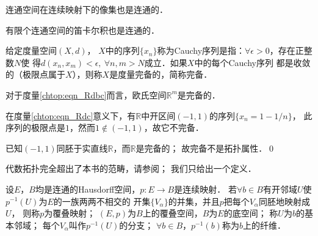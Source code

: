 \begin{proposition}
    连通空间在连续映射下的像集也是连通的．
\end{proposition}

\begin{proposition}
    有限个连通空间的笛卡尔积也是连通的．
\end{proposition}


\begin{definition}\label{chtop:def_complete-metric}
    给定度量空间$(X,d)$，
    $X$中的序列$\{x_n\}$称为Cauchy序列是指：$\forall \epsilon >0 $，存在正整数$N$使
    得$d(x_n,x_m)<\epsilon,\ \forall n,m>N$成立．如果$X$中的每个Cauchy序列
    都是收敛的（极限点属于$X$），则称$X$是{\heiti 度量完备}的，简称{\heiti 完备}．
     
\end{definition}

\begin{proposition}
    对于度量\eqref{chtop:eqn_Rdbc}而言，欧氏空间$\mathbb{R}^m$是完备的．
\end{proposition}

\begin{example}
    在度量\eqref{chtop:eqn_Rdc}意义下，有$\mathbb{R}$中开区间$(-1,1)$的序列$\{x_n=1-1/n\}$，
    此序列的极限点是$1$，然而$1 \notin (-1,1)$，故它不完备．
    
    已知$(-1,1)$同胚于实直线$\mathbb{R}$，而$\mathbb{R}$是完备的；
    故{\kaishu 完备不是拓扑属性}．\qed
\end{example}

代数拓扑完全超出了本书的范畴，请参阅\parencite{munkres-2000-topology}；
我们只给出一个定义．

\begin{definition}\label{chtop:def_covering-map}
    设$E，B$均是连通的Hausdorff空间，$p:E\to B$是连续映射．
    若$\forall b\in B$有开邻域$U$使$p^{-1}(U)$为$E$的一族两两不相交的
    开集$\{V_\alpha\}$的并集，并且$p$把每个$V_\alpha$同胚地映射成$U$，
    则称$p$为{\heiti 覆叠映射}；
    $(E,p)$为$B$上的{\heiti 覆叠空间}，$B$为$E$的{\heiti 底空间}；
    称$U$为$b$的{\heiti 基本邻域}；
    每个$V_\alpha$叫作$p^{-1}(U)$的{\heiti 分支}；
    $\forall b\in B$，$p^{-1}(b)$称为$b$上的{\heiti 纤维}．
     
\end{definition}


